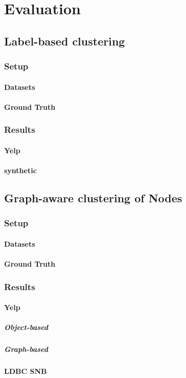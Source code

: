  \chapter{Evaluation}
 

\section{Label-based clustering}
    \subsection{Setup}
        \subsubsection{Datasets}
        \subsubsection{Ground Truth}

    \subsection{Results}
        \subsubsection{Yelp}
        \subsubsection{synthetic}
        
\section{Graph-aware clustering of Nodes}
    \subsection{Setup}
        \subsubsection{Datasets}
        \subsubsection{Ground Truth}
   
    \subsection{Results}
        \subsubsection{Yelp}
            \paragraph{Object-based}
            \paragraph{Graph-based}
        \subsubsection{LDBC SNB}